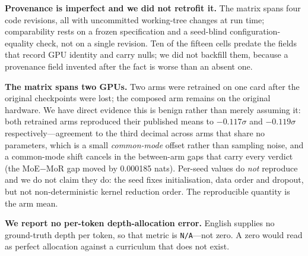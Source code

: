 \textbf{Provenance is imperfect and we did not retrofit it.} The matrix spans four
code revisions, all with uncommitted working-tree changes at run time;
comparability rests on a frozen specification and a seed-blind configuration-equality
check, not on a single revision. Ten of the fifteen cells predate the fields that
record GPU identity and carry nulls; we did not backfill them, because a provenance
field invented after the fact is worse than an absent one.

\textbf{The matrix spans two GPUs.} Two arms were retrained on one card after the
original checkpoints were lost; the composed arm remains on the original hardware.
We have direct evidence this is benign rather than merely assuming it: both
retrained arms reproduced their published means to $-0.117\sigma$ and $-0.119\sigma$
respectively---agreement to the third decimal across arms that share no
parameters, which is a small \emph{common-mode} offset rather than sampling noise,
and a common-mode shift cancels in the between-arm gaps that carry every verdict
(the MoE$-$MoR gap moved by 0.000185 nats). Per-seed values do \emph{not} reproduce
and we do not claim they do: the seed fixes initialisation, data order and dropout,
but not non-deterministic kernel reduction order. The reproducible quantity is the
arm mean.

\textbf{We report no per-token depth-allocation error.} English supplies no
ground-truth depth per token, so that metric is \texttt{N/A}---not zero. A zero
would read as perfect allocation against a curriculum that does not exist.
